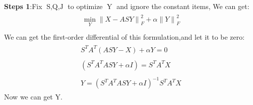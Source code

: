 \documentclass{article}
\begin{document}
\begin{flushleft}
\textbf{Steps 1}:\;\;Fix $\mathop{S,Q,J}$ to optimize $\mathop{Y}$ and ignore the constant items, We can get:
\begin{eqnarray}
\begin{array}{l}
    \mathop{\min}\limits_{Y} {\parallel X - ASY\parallel}_F^2 + \alpha{\parallel Y\parallel}_F^2\\
\end{array}
\end{eqnarray}
We can get the first-order differential of this formulation,and let it to be zero:
\begin{eqnarray}
\begin{array}{lll}
    S^TA^T(ASY-X) +\alpha Y = 0 \nonumber \\\\
    (S^TA^TASY+\alpha I) = S^TA^TX \nonumber \\\\
    Y = (S^TA^TASY+\alpha I)^{-1}S^TA^TX \nonumber
\end{array}
\end{eqnarray}
Now we can get Y.\\
\end{flushleft}
\end{document}
